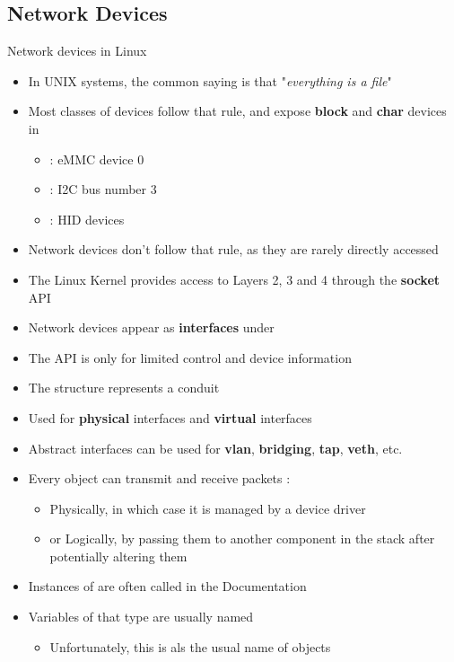 \subsection{Network Devices}

\begin{frame}{Network devices in Linux}
	\begin{itemize}
		\item In UNIX systems, the common saying is that "\textit{everything is a file}"
		\item Most classes of devices follow that rule, and expose \textbf{block} and \textbf{char} devices in 
			\begin{itemize}
				\item {} : eMMC device 0
				\item {} : I2C bus number 3
				\item {} : HID devices
			\end{itemize}
		\item Network devices don't follow that rule, as they are rarely directly accessed
		\item The Linux Kernel provides access to Layers 2, 3 and 4 through the \textbf{socket} API
		\item Network devices appear as \textbf{interfaces} under 
		\item The  API is only for limited control and device information
	\end{itemize}
\end{frame}

\begin{frame}{}
	\begin{itemize}
		\item The  structure represents a conduit
		\item Used for \textbf{physical} interfaces and \textbf{virtual} interfaces
		\item Abstract interfaces can be used for \textbf{vlan}, \textbf{bridging}, \textbf{tap}, \textbf{veth}, etc.
		\item Every  object can transmit and receive packets :
			\begin{itemize}
				\item Physically, in which case it is managed by a device driver
				\item or Logically, by passing them to another component in the stack after potentially altering them
			\end{itemize}
		\item Instances of  are often called  in the Documentation
		\item Variables of that type are usually named 
			\begin{itemize}
				\item Unfortunately, this is als the usual name of  objects
			\end{itemize}
	\end{itemize}
\end{frame}


